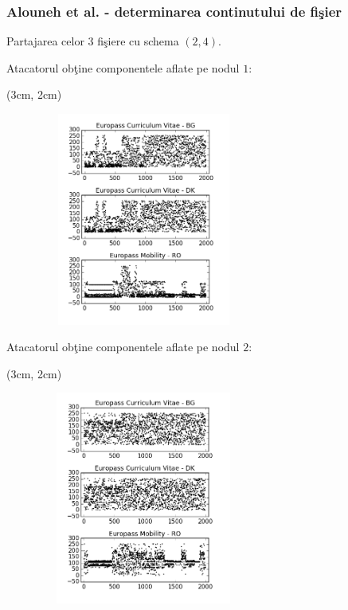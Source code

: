\documentclass{beamer}
\theoremstyle{definition}
\begin{document}
\begin{frame}
    \frametitle{Alouneh et al. - determinarea continutului de fi\c{s}ier}
    Partajarea celor 3 fi\c{s}iere cu schema $(2,4)$. 
     { 
        Atacatorul ob\c{t}ine componentele aflate pe nodul $1$:
       \begin{textblock*}{4cm}(3cm, 2cm)
            \begin{figure}
                \includegraphics[width=7cm,height=7cm,keepaspectratio]{img/results/db1.png}
           \end{figure}
        \end{textblock*} 
    }
     {
     Atacatorul ob\c{t}ine componentele aflate pe nodul $2$:
       \begin{textblock*}{4cm}(3cm, 2cm)
            \begin{figure}
                \includegraphics[width=7cm,height=7cm,keepaspectratio]{img/results/db2.png}
           \end{figure}
        \end{textblock*} 
    }
\end{frame}
\end{document}
